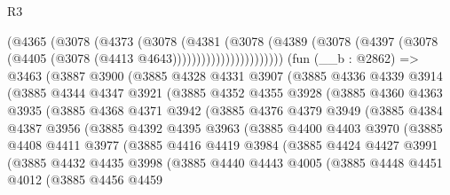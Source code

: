 \begin{lexlean}{R3}
\begin{coremodule}
                        (@4365
                          (@3078
                            (@4373
                              (@3078
                                (@4381
                                  (@3078
                                    (@4389
                                      (@3078
                                        (@4397
                                          (@3078 (@4405 (@3078 (@4413 @4643)))))))))))))))))))))))
    (fun (__b : @2862) =>
    @3463
      (@3887
        @3900
        (@3885
          @4328
          @4331
          @3907
          (@3885
            @4336
            @4339
            @3914
            (@3885
              @4344
              @4347
              @3921
              (@3885
                @4352
                @4355
                @3928
                (@3885
                  @4360
                  @4363
                  @3935
                  (@3885
                    @4368
                    @4371
                    @3942
                    (@3885
                      @4376
                      @4379
                      @3949
                      (@3885
                        @4384
                        @4387
                        @3956
                        (@3885
                          @4392
                          @4395
                          @3963
                          (@3885
                            @4400
                            @4403
                            @3970
                            (@3885
                              @4408
                              @4411
                              @3977
                              (@3885
                                @4416
                                @4419
                                @3984
                                (@3885
                                  @4424
                                  @4427
                                  @3991
                                  (@3885
                                    @4432
                                    @4435
                                    @3998
                                    (@3885
                                      @4440
                                      @4443
                                      @4005
                                      (@3885
                                        @4448
                                        @4451
                                        @4012
                                        (@3885
                                          @4456
                                          @4459

\end{coremodule}
\end{lexlean}

